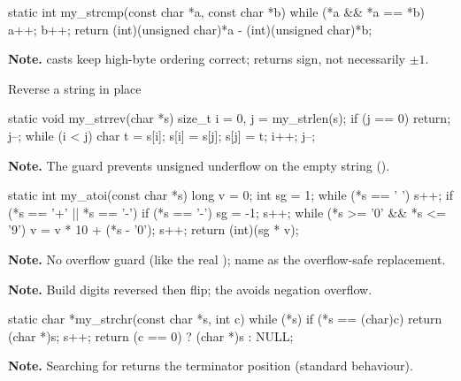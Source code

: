 \begin{gymproblem}{}
\begin{cgym}
static int my_strcmp(const char *a, const char *b) {
    while (*a && *a == *b) { a++; b++; }
    return (int)(unsigned char)*a - (int)(unsigned char)*b;
}
\end{cgym}
\textbf{Note.}  casts keep high-byte ordering correct;
returns sign, not necessarily $\pm1$.
\end{gymproblem}

\begin{gymproblem}{Reverse a string in place}
\begin{cgym}
static void my_strrev(char *s) {
    size_t i = 0, j = my_strlen(s);
    if (j == 0) return;
    j--;
    while (i < j) { char t = s[i]; s[i] = s[j]; s[j] = t; i++; j--; }
}
\end{cgym}
\textbf{Note.} The  guard prevents unsigned underflow on the empty
string ().
\end{gymproblem}

\begin{gymproblem}{}
\begin{cgym}
static int my_atoi(const char *s) {
    long v = 0; int sg = 1;
    while (*s == ' ') s++;
    if (*s == '+' || *s == '-') { if (*s == '-') sg = -1; s++; }
    while (*s >= '0' && *s <= '9') { v = v * 10 + (*s - '0'); s++; }
    return (int)(sg * v);
}
\end{cgym}
\textbf{Note.} No overflow guard (like the real ); name 
as the overflow-safe replacement.
\end{gymproblem}

\begin{gymproblem}{}
\textbf{Note.} Build digits reversed then flip; the  avoids
 negation overflow.
\end{gymproblem}

\begin{gymproblem}{}
\begin{cgym}
static char *my_strchr(const char *s, int c) {
    while (*s) { if (*s == (char)c) return (char *)s; s++; }
    return (c == 0) ? (char *)s : NULL;
}
\end{cgym}
\textbf{Note.} Searching for  returns the terminator
position (standard behaviour).
\end{gymproblem}

